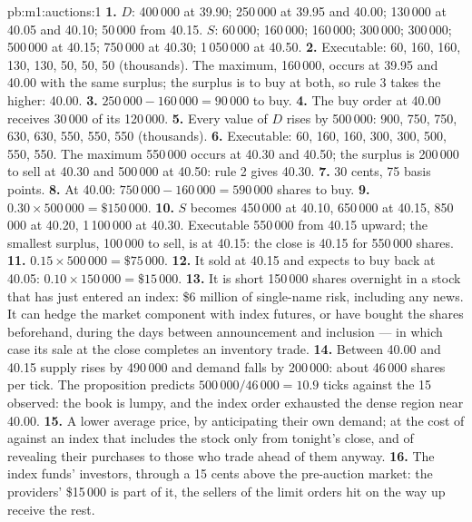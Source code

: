 \begin{solution}{pb:m1:auctions:1}
\textbf{1.} $D$: 400\,000 at 39.90; 250\,000 at 39.95 and 40.00; 130\,000 at
40.05 and 40.10; 50\,000 from 40.15. $S$: 60\,000; 160\,000; 160\,000;
300\,000; 300\,000; 500\,000 at 40.15; 750\,000 at 40.30; 1\,050\,000 at
40.50.
\textbf{2.} Executable: 60, 160, 160, 130, 130, 50, 50, 50 (thousands). The
maximum, 160\,000, occurs at 39.95 and 40.00 with the same surplus; the
surplus is to buy at both, so rule 3 takes the higher: 40.00.
\textbf{3.} $250\,000 - 160\,000 = 90\,000$ to buy.
\textbf{4.} The buy order at 40.00 receives 30\,000 of its 120\,000.
\textbf{5.} Every value of $D$ rises by 500\,000: 900, 750, 750, 630, 630,
550, 550, 550 (thousands).
\textbf{6.} Executable: 60, 160, 160, 300, 300, 500, 550, 550. The maximum
550\,000 occurs at 40.30 and 40.50; the surplus is 200\,000 to sell at 40.30
and 500\,000 at 40.50: rule 2 gives 40.30.
\textbf{7.} 30 cents, 75 basis points.
\textbf{8.} At 40.00: $750\,000 - 160\,000 = 590\,000$ shares to buy.
\textbf{9.} $0.30 \times 500\,000 = \$150\,000$.
\textbf{10.} $S$ becomes 450\,000 at 40.10, 650\,000 at 40.15, 850\,000 at
40.20, 1\,100\,000 at 40.30. Executable 550\,000 from 40.15 upward; the
smallest surplus, 100\,000 to sell, is at 40.15: the close is 40.15 for
550\,000 shares.
\textbf{11.} $0.15 \times 500\,000 = \$75\,000$.
\textbf{12.} It sold at 40.15 and expects to buy back at 40.05: $0.10 \times
150\,000 = \$15\,000$.
\textbf{13.} It is short 150\,000 shares overnight in a stock that has just
entered an index: \$6 million of single-name risk, including any news. It can
hedge the market component with index futures, or have bought the shares
beforehand, during the days between announcement and inclusion --- in which
case its sale at the close completes an inventory trade.
\textbf{14.} Between 40.00 and 40.15 supply rises by 490\,000 and demand
falls by 200\,000: about 46\,000 shares per tick. The proposition predicts
$500\,000/46\,000 = 10.9$ ticks against the 15 observed: the book is lumpy,
and the index order exhausted the dense region near 40.00.
\textbf{15.} A lower average price, by anticipating their own demand; at the
cost of  against an index that includes the stock only from
tonight's close, and of revealing their purchases to those who trade ahead
of them anyway.
\textbf{16.} The index funds' investors, through a  15 cents
above the pre-auction market: the providers' \$15\,000 is part of it, the
sellers of the limit orders hit on the way up receive the rest.

\end{solution}
